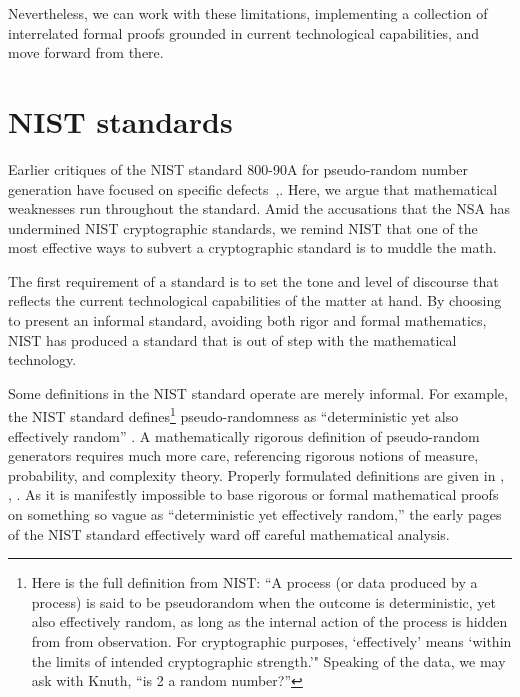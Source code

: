 \documentclass[11pt]{amsart} %
\begin{document}
Nevertheless, we can work with these limitations, implementing a collection of interrelated formal proofs
grounded in current technological capabilities, and move forward from there.


\section{NIST standards}

Earlier critiques of the NIST standard 800-90A for pseudo-random number
generation have focused on specific
defects~\cite{Green-EC},\cite{2006-190}.  Here, we argue that 
mathematical weaknesses run throughout the standard.  Amid the accusations that the NSA has undermined NIST
cryptographic standards, we remind NIST that one of the most effective ways to subvert a cryptographic standard is to 
muddle the math.

The first requirement of a standard is to set the tone and level of discourse that reflects the current
technological capabilities of the matter at hand.  By choosing to present an informal standard, 
avoiding both rigor and formal mathematics,
NIST has produced a standard that is out of step with the mathematical technology.

Some definitions in the NIST standard 
operate are merely informal.
For example,  the NIST standard defines\footnote{Here is the full definition from NIST: 
``A process (or data produced by a process) is said to be pseudorandom when the
outcome is deterministic, yet also effectively random, as long as the internal action of the process
is hidden from from observation.  For cryptographic purposes, `effectively' means `within the limits
of intended cryptographic strength.'"  Speaking of the data, we may ask with Knuth,  ``is 2 a random number?'' } 
pseudo-randomness as ``deterministic yet also effectively random'' \cite[page 7]{NIST}.
A mathematically rigorous definition of pseudo-random generators
requires much more care, referencing rigorous notions of measure, probability,
and complexity theory.  Properly formulated definitions are given in \cite{Luby1996}, \cite{Yao82}, \cite{BM84}.
As it is manifestly impossible to base rigorous or formal mathematical proofs
on something so vague as ``deterministic yet effectively random,'' the early pages of the NIST standard 
effectively ward off careful mathematical analysis.
\end{document}

